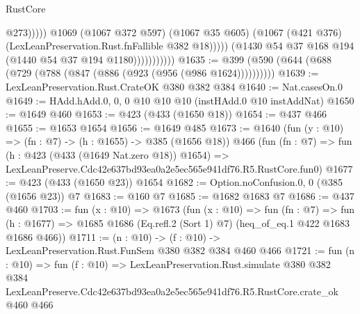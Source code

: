 \begin{lexlean}{RustCore}
\begin{coremodule}
                                      @273)))))
                            @1069
                            (@1067 @372 @597)
                            (@1067 @35 @605)
                            (@1067 (@421 @376) (LexLeanPreservation.Rust.fnFallible @382 @18)))))
                      (@1430 @54 @37 @168 @194 (@1440 @54 @37 @194 @1180)))))))))))
@1635 := @399 (@590 (@644 (@688 (@729 (@788 (@847 (@886 (@923 (@956 (@986 @1624))))))))))
@1639 := LexLeanPreservation.Rust.CrateOK @380 @382 @384
@1640 := Nat.casesOn.{0}
@1649 := HAdd.hAdd.{0, 0, 0} @10 @10 @10 (instHAdd.{0} @10 instAddNat)
@1650 := @1649 @460
@1653 := @423 (@433 (@1650 @18))
@1654 := @437 @466
@1655 := @1653 @1654
@1656 := @1649 @485
@1673 := @1640
    (fun (y : @10) => (fn : @7) -> (h : @1655) -> @385 (@1656 @18))
    @466
    (fun (fn : @7) =>
    fun (h : @423 (@433 (@1649 Nat.zero @18)) @1654) =>
    LexLeanPreserve.Cdc42e637bd93ea0a2e5ec565e941df76.R5.RustCore.fun0)
@1677 := @423 (@433 (@1650 @23)) @1654
@1682 := Option.noConfusion.{0, 0} (@385 (@1656 @23)) @7
@1683 := @160 @7
@1685 := @1682 @1683 @7
@1686 := @437 @460
@1703 := fun (x : @10) =>
  @1673
    (fun (x : @10) =>
    fun (fn : @7) =>
    fun (h : @1677) => @1685 @1686 (Eq.refl.{2} (Sort 1) @7) (heq_of_eq.{1} @422 @1683 @1686 @466))
@1711 := (n : @10) -> (f : @10) -> LexLeanPreservation.Rust.FunSem @380 @382 @384 @460 @466
@1721 := fun (n : @10) =>
  fun (f : @10) =>
  LexLeanPreservation.Rust.simulate
    @380
    @382
    @384
    LexLeanPreserve.Cdc42e637bd93ea0a2e5ec565e941df76.R5.RustCore.crate_ok
    @460
    @466
\end{coremodule}
\end{lexlean}
